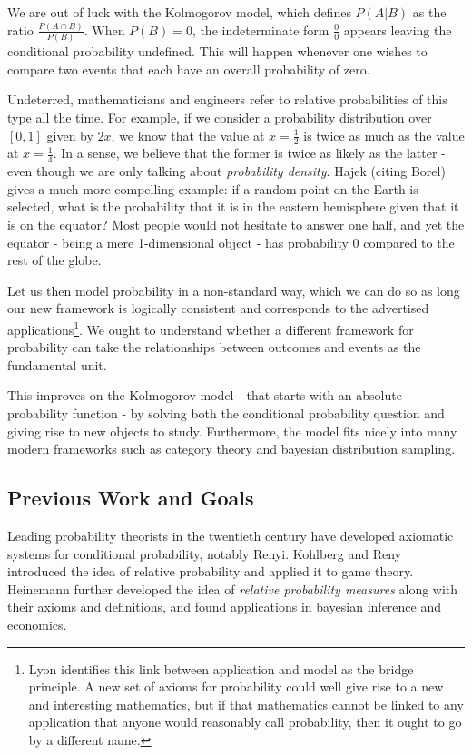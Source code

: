 \documentclass[twoside]{article}
\theoremstyle{plain}%
\theoremstyle{definition}
\theoremstyle{remark}
\begin{document}
We are out of luck with the Kolmogorov model, which defines \(P(A|B)\) as the ratio \(\frac{P(A \cap B)}{P(B)}\). When \(P(B) = 0\), the indeterminate form \(\frac{0}{0}\) appears leaving the conditional probability undefined. This will happen whenever one wishes to compare two events that each have an overall probability of zero.

Undeterred, mathematicians and engineers refer to relative probabilities of this type all the time. For example, if we consider a probability distribution over \([0, 1]\) given by \(2x\), we know that the value at \(x = \frac{1}{2}\) is twice as much as the value at \(x = \frac{1}{4}\). In a sense, we believe that the former is twice as likely as the latter - even though we are only talking about \textit{probability density}. Hajek\cite{hajek} (citing Borel) gives a much more compelling example: if a random point on the Earth is selected, what is the probability that it is in the eastern hemisphere given that it is on the equator? Most people would not hesitate to answer one half, and yet the equator - being a mere 1-dimensional object - has probability 0 compared to the rest of the globe.

Let us then model probability in a non-standard way, which we can do so as long our new framework is logically consistent and corresponds to the advertised applications\footnote{Lyon identifies this link between application and model as the bridge principle. A new set of axioms for probability could well give rise to a new and interesting mathematics, but if that mathematics cannot be linked to any application that anyone would reasonably call probability, then it ought to go by a different name.}. We ought to understand whether a different framework for probability can take the relationships between outcomes and events as the fundamental unit.

This improves on the Kolmogorov model - that starts with an absolute probability function - by solving both the conditional probability question and giving rise to new objects to study. Furthermore, the model fits nicely into many modern frameworks such as category theory and bayesian distribution sampling.

\subsection{Previous Work and Goals}

Leading probability theorists in the twentieth century have developed axiomatic systems for conditional probability, notably Renyi\cite{renyi}. Kohlberg and Reny\cite{kohlberg} introduced the idea of relative probability and applied it to game theory. Heinemann\cite{heinemann} further developed the idea of \textit{relative probability measures} along with their axioms and definitions, and found applications in bayesian inference and economics\cite{heinemann_econ}.
\end{document}
